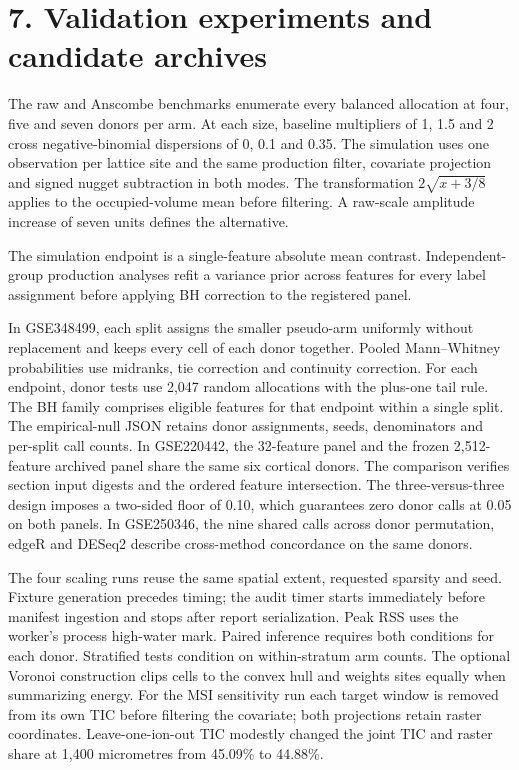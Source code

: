\documentclass[11pt]{article}
\begin{document}
\section*{7. Validation experiments and candidate archives}
The raw and Anscombe benchmarks enumerate every balanced allocation at four, five and seven donors per arm. At each size, baseline multipliers of 1, 1.5 and 2 cross negative-binomial dispersions of 0, 0.1 and 0.35. The simulation uses one observation per lattice site and the same production filter, covariate projection and signed nugget subtraction in both modes. The transformation $2\sqrt{x+3/8}$ applies to the occupied-volume mean before filtering. A raw-scale amplitude increase of seven units defines the alternative.

The simulation endpoint is a single-feature absolute mean contrast. Independent-group production analyses refit a variance prior across features for every label assignment before applying BH correction to the registered panel.

In GSE348499, each split assigns the smaller pseudo-arm uniformly without replacement and keeps every cell of each donor together. Pooled Mann--Whitney probabilities use midranks, tie correction and continuity correction. For each endpoint, donor tests use 2,047 random allocations with the plus-one tail rule. The BH family comprises eligible features for that endpoint within a single split. The empirical-null JSON retains donor assignments, seeds, denominators and per-split call counts. In GSE220442, the 32-feature panel and the frozen 2,512-feature archived panel share the same six cortical donors. The comparison verifies section input digests and the ordered feature intersection. The three-versus-three design imposes a two-sided floor of 0.10, which guarantees zero donor calls at 0.05 on both panels. In GSE250346, the nine shared calls across donor permutation, edgeR and DESeq2 describe cross-method concordance on the same donors.

The four scaling runs reuse the same spatial extent, requested sparsity and seed. Fixture generation precedes timing; the audit timer starts immediately before manifest ingestion and stops after report serialization. Peak RSS uses the worker's process high-water mark. Paired inference requires both conditions for each donor. Stratified tests condition on within-stratum arm counts. The optional Voronoi construction clips cells to the convex hull and weights sites equally when summarizing energy. For the MSI sensitivity run each target window is removed from its own TIC before filtering the covariate; both projections retain raster coordinates. Leave-one-ion-out TIC modestly changed the joint TIC and raster share at 1,400 micrometres from 45.09\% to 44.88\%.
\end{document}
